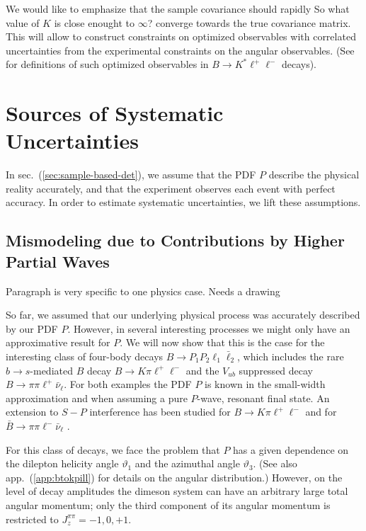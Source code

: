 \documentclass[aps,prd,reprint,nofootinbib,preprintnumbers]{revtex4}
\newcommand{\refapp}[1]{app.~(\ref{app:#1})}
\newcommand{\refsec}[1]{sec.~(\ref{sec:#1})}
\renewcommand{\theta}{\vartheta}
\newcommand{\fred}[1]{{\color{brown!85!black}#1}}
\begin{document}
We would like to emphasize that the sample covariance should rapidly \fred{So what value of $K$ is close enought to $\infty$?} converge towards the true covariance matrix.
This will allow to construct constraints on optimized observables with correlated uncertainties
from the experimental constraints on the angular observables. (See \cite{Egede:2008uy,Egede:2010zc,Bobeth:2010wg,Becirevic:2011bp,Bobeth:2012vn,Matias:2012xw,DescotesGenon:2012zf}
for definitions of such optimized observables in $B\to K^*\ell^+\ell^-$ decays).



\section{Sources of Systematic Uncertainties}
\label{sec:systematics}

In \refsec{sample-based-det}, we assume that the PDF $P$ describe the physical reality accurately,
and that the experiment observes each event with perfect accuracy. In order to estimate systematic
uncertainties, we lift these assumptions.

\subsection{Mismodeling due to Contributions by Higher Partial Waves}
\label{sec:systematics:partial-waves}

\fred{Paragraph is very specific to one physics case. Needs a drawing}

So far, we assumed that our underlying physical process was accurately described by our PDF $P$.
However, in several interesting processes we might only have an approximative result for $P$.
We will now show that this is the case for the interesting class of four-body decays $B\to P_1 P_2 \ell_1 \bar\ell_2$,
which includes the rare $b\to s$-mediated $B$ decay $B \to K\pi\ell^+\ell^-$ and the $V_{ub}$ suppressed decay
$B\to \pi\pi\ell^+\bar\nu_\ell$. For both examples the PDF $P$ is known in the small-width approximation
and when assuming a pure $P$-wave, resonant final state. An extension to $S-P$ interference has been
studied for $B\to K\pi\ell^+\ell^-$ \cite{Blake:2012xx,Becirevic:2011xx} and for $\bar{B}\to \pi\pi\ell^-\bar\nu_\ell$
\cite{Faller:2013xx}.

For this class of decays, we face the problem that $P$ has a given dependence on the dilepton helicity angle $\theta_1$
and the azimuthal angle $\theta_3$. (See also \refapp{btokpill} for details on the angular distribution.)
However, on the level of decay amplitudes the dimeson system can have an arbitrary
large total angular momentum; only the third component of its angular momentum is restricted to $J^{\pi\pi}_z = -1,0,+1$.\\
\end{document}
